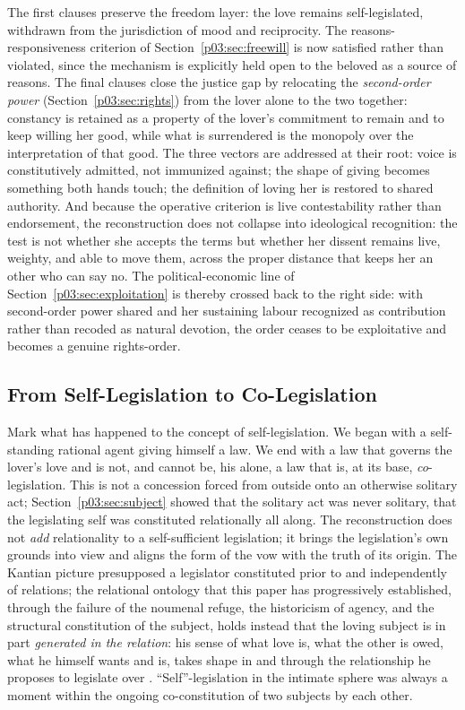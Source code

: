 The first clauses preserve the freedom layer: the love remains self-legislated, withdrawn from the jurisdiction of mood and reciprocity. The reasons-responsiveness criterion of Section~\ref{p03:sec:freewill} is now satisfied rather than violated, since the mechanism is explicitly held open to the beloved as a source of reasons. The final clauses close the justice gap by relocating the \emph{second-order power} (Section~\ref{p03:sec:rights}) from the lover alone to the two together: constancy is retained as a property of the lover's commitment to remain and to keep willing her good, while what is surrendered is the monopoly over the interpretation of that good. The three vectors are addressed at their root: voice is constitutively admitted, not immunized against; the shape of giving becomes something both hands touch; the definition of loving her is restored to shared authority. And because the operative criterion is live contestability rather than endorsement, the reconstruction does not collapse into ideological recognition: the test is not whether she accepts the terms but whether her dissent remains live, weighty, and able to move them, across the proper distance that keeps her an other who can say no. The political-economic line of Section~\ref{p03:sec:exploitation} is thereby crossed back to the right side: with second-order power shared and her sustaining labour recognized as contribution rather than recoded as natural devotion, the order ceases to be exploitative and becomes a genuine rights-order.

\subsection{From Self-Legislation to Co-Legislation}

Mark what has happened to the concept of self-legislation. We began with a self-standing rational agent giving himself a law. We end with a law that governs the lover's love and is not, and cannot be, his alone, a law that is, at its base, \emph{co}-legislation. This is not a concession forced from outside onto an otherwise solitary act; Section~\ref{p03:sec:subject} showed that the solitary act was never solitary, that the legislating self was constituted relationally all along. The reconstruction does not \emph{add} relationality to a self-sufficient legislation; it brings the legislation's own grounds into view and aligns the form of the vow with the truth of its origin. The Kantian picture presupposed a legislator constituted prior to and independently of relations; the relational ontology that this paper has progressively established, through the failure of the noumenal refuge, the historicism of agency, and the structural constitution of the subject, holds instead that the loving subject is in part \emph{generated in the relation}: his sense of what love is, what the other is owed, what he himself wants and is, takes shape in and through the relationship he proposes to legislate over \parencite{nedelsky1989reconceiving, mackenzie2000relational, helm2010love}. ``Self''-legislation in the intimate sphere was always a moment within the ongoing co-constitution of two subjects by each other.

